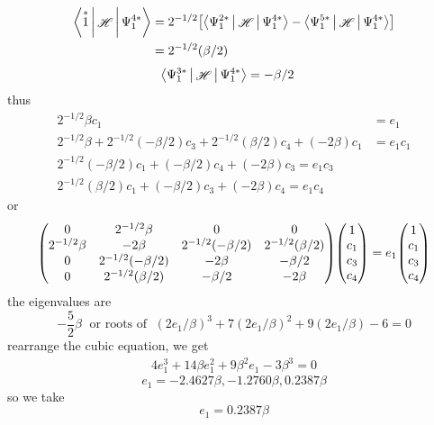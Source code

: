 \documentclass[a4paper]{article}
\DeclareMathOperator{\sH}{\mathscr{H}}
\numberwithin{equation}{subsection}
\begin{document}
\begin{align}
\Braket{\overset{*}{1} | \sH | \Psi_1^{4*}} &= 2^{-1/2}\qty[\Braket{\Psi_1^{2*} | \sH | \Psi_1^{4*}} - \Braket{\Psi_1^{5*} | \sH | \Psi_1^{4*}}] \notag\\
&= 2^{-1/2} (\beta/2)
\end{align}
\begin{align}
\Braket{\Psi_1^{3*} | \sH | \Psi_1^{4*}} 
&= -\beta/2
\end{align}
thus
\begin{align}
2^{-1/2}\beta c_1 &= e_1 \\
2^{-1/2}\beta + 2^{-1/2}(-\beta/2) c_3 + 2^{-1/2}(\beta/2) c_4 + (-2\beta) c_1 &= e_1 c_1\\
2^{-1/2}(-\beta/2) c_1 + (-\beta/2) c_4 + (-2\beta) c_3 = e_1 c_3\\
2^{-1/2} (\beta/2) c_1 + (-\beta/2) c_3 + (-2\beta) c_4 = e_1 c_4
\end{align}
or
\begin{align}
\mqty(0 & 2^{-1/2}\beta & 0 & 0\\
      2^{-1/2}\beta & -2\beta & 2^{-1/2}(-\beta/2) & 2^{-1/2}(\beta/2)\\
      0 & 2^{-1/2}(-\beta/2) & -2\beta & -\beta/2\\
      0 & 2^{-1/2}(\beta/2) & -\beta/2 & -2\beta)
\mqty(1 \\ c_1 \\ c_3 \\ c_4)
= e_1 \mqty(1 \\ c_1 \\ c_3 \\ c_4)
\end{align}
the eigenvalues are
\begin{equation}\label{key}
-\dfrac{5}{2}\beta \;\text{ or roots of }\; 
(2e_1/\beta)^3 + 7(2e_1/\beta)^2 + 9(2e_1/\beta) - 6 = 0
\end{equation}
rearrange the cubic equation, we get
\begin{align}
4e_1^3 + 14\beta e_1^2 + 9\beta^2 e_1 - 3\beta^3 = 0
\end{align}
\begin{equation}\label{key}
e_1 = -2.4627\beta, -1.2760\beta, 0.2387\beta
\end{equation}
so we take
\begin{equation}\label{key}
e_1 = 0.2387\beta
\end{equation}
\end{document}
